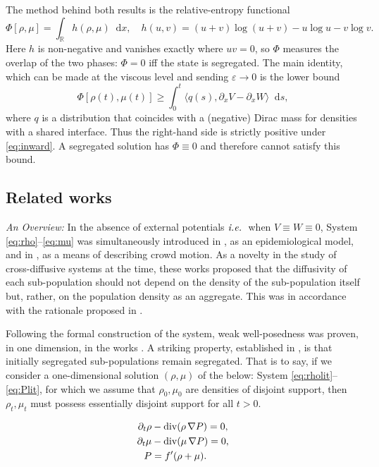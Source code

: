 \documentclass[a4paper,twosided, 11pt]{article}
\newcommand{\eps}{\varepsilon}
\newcommand{\R}{\mathbb{R}}
\newcommand {\Div}  { {\rm div} }
\theoremstyle{plain}
\theoremstyle{remark}
\newcommand{\ie}{\emph{i.e.}\;}
\newcommand{\diff}{\mathop{} \mathrm{d}}
\numberwithin{equation}{section}
\begin{document}
The method behind both results is the relative-entropy functional
\begin{equation}\label{eq:Phi-intro}
\Phi[\rho,\mu]=\int_\R h(\rho,\mu)\diff x,
\quad h(u,v)=(u+v)\log(u+v)-u\log u-v\log v .
\end{equation}
 Here $h$ is non-negative and vanishes exactly where $uv=0$, so $\Phi$ measures the overlap of the two phases: $\Phi=0$ iff the state is segregated. The main identity, which can be made at the viscous level and sending $\eps\to 0$ is the lower bound
$$
\Phi[\rho(t),\mu(t)]\ge \int_0^t \langle q(s),\partial_x V-\partial_x W\rangle\diff  s,
$$
where $q$ is a distribution that coincides with a (negative) Dirac mass for densities with a shared interface. Thus the right-hand side is strictly positive under \eqref{eq:inward}. A segregated solution has $\Phi\equiv 0$ and therefore cannot satisfy this bound.

\subsection{Related works}
\emph{An Overview:} In the absence of external potentials $\ie$ when $V \equiv W \equiv 0$, System \eqref{eq:rho}--\eqref{eq:mu} was simultaneously introduced in \cite{TravisBusenberg83}, as an epidemiological model, and in \cite{GurtinPipkin84}, as a means of describing crowd motion. 
As a novelty in the study of cross-diffusive systems at the time, these works proposed that the diffusivity of each sub-population should not depend on the density of the sub-population itself but, rather, on the population density as an aggregate. 
This was in accordance with the rationale proposed in \cite{gurtinmaccamy77}. 

\medskip 

Following the formal construction of the system, weak well-posedness was proven, in one dimension, in the works \cite{BertschPeletier85, BertschGurtin87EqualVelocity}. 
A striking property, established in \cite{BertschPeletier85}, is that initially segregated sub-populations remain segregated. 
That is to say, if we consider a one-dimensional solution $(\rho,\mu)$ of the below: System \eqref{eq:rholit}--\eqref{eq:Plit}, for which we assume that $\rho_0,\mu_0$ are densities of disjoint support, then $\rho_t, \mu_t$ must possess essentially disjoint support for all $t > 0$.

\medskip 


\begin{align}
\partial_t\rho &- \Div(\rho\,\nabla P)= 0,\label{eq:rholit}\\
\partial_t\mu  & - \Div(\mu\,\nabla P)= 0,\label{eq:mulit}\\
P & = f'(\rho+\mu).\label{eq:Plit}
\end{align}
\end{document}
